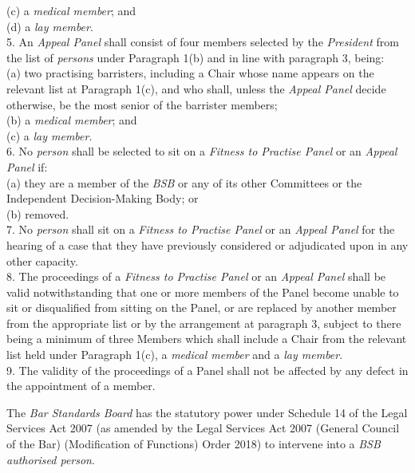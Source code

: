 (c) a \emph{medical member}; and\\
(d) a \emph{lay member}.\\
5. An \emph{Appeal Panel} shall consist of four members selected by
the \emph{President} from the list of \emph{persons} under Paragraph
1(b) and in line with paragraph 3, being:\\
(a) two practising barristers, including a Chair whose name appears on
the relevant list at Paragraph 1(c), and who shall, unless
the \emph{Appeal Panel} decide otherwise, be the most senior of the
barrister members;\\
(b) a \emph{medical member}; and\\
(c) a \emph{lay member}.\\
6. No \emph{person} shall be selected to sit on a \emph{Fitness to
Practise Panel} or an \emph{Appeal Panel} if:\\
(a) they are a member of the \emph{BSB} or any of its other Committees
or the Independent Decision-Making Body; or\\
(b) removed.\\
7. No \emph{person} shall sit on a \emph{Fitness to Practise Panel }or
an \emph{Appeal Panel} for the hearing of a case that they have
previously considered or adjudicated upon in any other capacity.\\
8. The proceedings of a \emph{Fitness to Practise Panel }or
an \emph{Appeal Panel} shall be valid notwithstanding that one or more
members of the Panel become unable to sit or disqualified from sitting
on the Panel, or are replaced by another member from the appropriate
list or by the arrangement at paragraph 3, subject to there being a
minimum of three Members which shall include a Chair from the relevant
list held under Paragraph 1(c), a \emph{medical member} and a \emph{lay
member}.\\
9. The validity of the proceedings of a Panel shall not be affected by
any defect in the appointment of a member.\\
\par
{}
The \emph{Bar Standards Board} has the statutory power under Schedule 14
of the Legal Services Act 2007 (as amended by the Legal Services Act
2007 (General Council of the Bar) (Modification of Functions) Order
2018) to intervene into a \emph{BSB authorised person}.\\
\par
